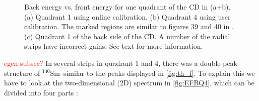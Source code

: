 \documentclass[twoside,english]{uiofysmaster/uiofysmaster}
\newcommand{\Sm}{$^{140}$Sm} %
\let\orgautoref\autoref
\renewcommand{\autoref}
        {%
		 \def\sectionautorefname{Section}%
		 \def\subsectionautorefname{Section}%
		 \def\subsubsectionautorefname{Section}%
		 \def\chapterautorefname{Chapter}%
          \orgautoref}
\begin{document}
\begin{figure}[htb]
\begin{subfigure}[t]{0.49\textwidth}
		\caption{}
		\label{fig:CD_cal_back}
	\end{subfigure}
	\caption{Back energy vs. front energy for one quadrant of the CD in (a+b). 
	(a) Quadrant 1 using online calibration.
	(b) Quadrant 4 using user calibration. The marked regions are similar to figures 39 and 40 in \cite{Rosiak}.
	(c) Quadrant 1 of the back side of the CD. A number of the radial strips have incorrect gains.
	See text for more information.}
	\label{fig:FBE}
\end{figure}


\textcolor{red}{egen subsec?}\newline
In several strips in quadrant 1 and 4, there was a double-peak structure of \Sm\ similar to the peaks displayed in \autoref{fig:th_f}. 
To explain this we have to look at the two-dimensional (2D) spectrum in \autoref{fig:EFBQ4}, which can be divided into four parts \cite{Rosiak}:
\end{document}
